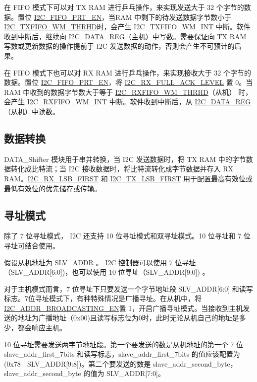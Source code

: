 \documentclass[main\_\_CN.tex]{subfiles}
\begin{document}
在 FIFO 模式下可以对 TX RAM 进行乒乓操作，来实现发送大于 32 个字节的数据。置位 \hyperref[fielddesc:I2CFIFOPRTEN]{I2C\_FIFO\_PRT\_EN}，当RAM 中剩下的待发送数据字节数小于 \hyperref[fielddesc:I2CTXFIFOWMTHRHD]{I2C\_TXFIFO\_WM\_THRHD}时，会产生 I2C\_TXFIFO\_WM\_INT 中断。软件收到中断后，继续向 \hyperref[regdesc:I2CDATAREG]{I2C\_DATA\_REG}（主机）中写数。需要保证向 TX RAM 写数或更新数据的操作提前于 I2C 发送数据的动作，否则会产生不可预计的后果。

在 FIFO 模式下也可以对 RX RAM 进行乒乓操作，来实现接收大于 32 个字节的数据。置位 \hyperref[fielddesc:I2CFIFOPRTEN]{I2C\_FIFO\_PRT\_EN}，将 \hyperref[fielddesc:I2CRXFULLACKLEVEL]{I2C\_RX\_FULL\_ACK\_LEVEL} 置 0。当 RAM 中收到的数据字节数大于等于 \hyperref[fielddesc:I2CRXFIFOWMTHRHD]{I2C\_RXFIFO\_WM\_THRHD}（从机） 时，会产生 I2C\_RXFIFO\_WM\_INT 中断。软件收到中断后，从 \hyperref[regdesc:I2CDATAREG]{I2C\_DATA\_REG} （从机）中读数。

\subsection{数据转换}
DATA\_Shifter 模块用于串并转换，当 I2C 发送数据时，将 TX RAM 中的字节数据转化成比特流；当 I2C 接收数据时，将比特流转化成字节数据并存入 RX RAM。\hyperref[fielddesc:I2CRXLSBFIRST]{I2C\_RX\_LSB\_FIRST} 和 \hyperref[fielddesc:I2CTXLSBFIRST]{I2C\_TX\_LSB\_FIRST} 用于配置最高有效位或最低有效位的优先储存或传输。

\subsection{寻址模式}
除了 7 位寻址模式，\chipname{} I2C 还支持 10 位寻址模式和双寻址模式。10 位寻址和 7 位寻址可结合使用。

假设从机地址为 SLV\_ADDR 。 \chipname{} I2C 控制器可以使用 7 位寻址（SLV\_ADDR[6:0])，也可以使用 10 位寻址（SLV\_ADDR[9:0]) 。

对于主机模式而言，7 位寻址下只要发送一个字节地址段 SLV\_ADDR[6:0] 和读写标志。7位寻址模式下，有种特殊情况是广播寻址。在从机中，将 \hyperref[fielddesc:I2CADDRBROADCASTINGEN]{I2C\_ADDR\_BROADCASTING\_EN}置 1，开启广播寻址模式。当接收到主机发送的地址为广播地址（0x{}00)且读写标志位为0时，此时无论从机自己的地址是多少，都会响应主机。

10 位寻址需要发送两字节地址段。第一个要发送的数是从机地址的第一个 7 位 slave\_addr\_first\_7bits 和读写标志，slave\_addr\_first\_7bits 的值应该配置为 (0x{}78 | SLV\_ADDR[9:8])。第二个要发送的数是 slave\_addr\_second\_byte，slave\_addr\_second\_byte 的值为 SLV\_ADDR[7:0]。
\end{document}
